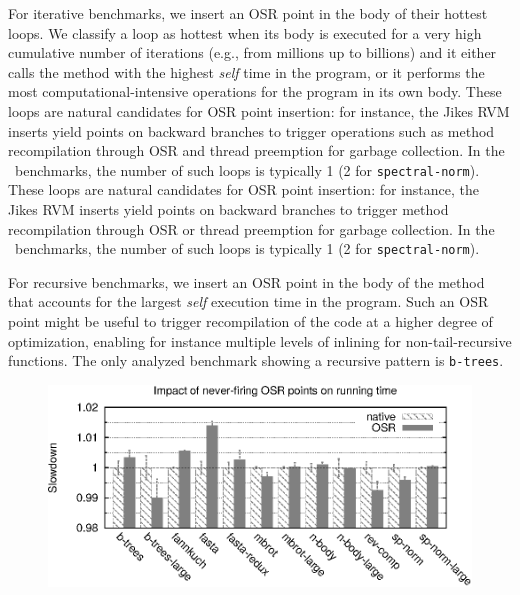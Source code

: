 \begin{description}
For iterative benchmarks, we insert an OSR point in the body of their hottest loops. We classify a loop as hottest when its body is executed for a very high cumulative number of iterations (e.g., from millions up to billions) and it either calls the method with the highest {\em self} time in the program, or it performs the most computational-intensive operations for the program in its own body.
\ifdefined \fullver
These loops are natural candidates for OSR point insertion: for instance, the Jikes RVM inserts yield points on backward branches to trigger operations such as method recompilation through OSR and thread preemption for garbage collection. In the \shootout\ benchmarks, the number of such loops is typically 1 (2 for {\tt spectral-norm}).
\else
These loops are natural candidates for OSR point insertion: for instance, the Jikes RVM inserts yield points on backward branches to trigger method recompilation through OSR or thread preemption for garbage collection. In the \shootout\ benchmarks, the number of such loops is typically 1 (2 for {\tt spectral-norm}).
\fi

For recursive benchmarks, we insert an OSR point in the body of the method that accounts for the largest {\em self} execution time in the program. Such an OSR point might be useful to trigger recompilation of the code at a higher degree of optimization, enabling for instance multiple levels of inlining for non-tail-recursive functions. The only analyzed benchmark showing a recursive pattern is {\tt b-trees}.


\ifdefined\noauthorea
\begin{figure}[t]
\begin{center}
\includegraphics[width=0.95\columnwidth]{figures/code-quality-noBB/code-quality-noBB.eps}
\caption{\protect}
\end{center}
\end{figure}
\fi


\end{description}
